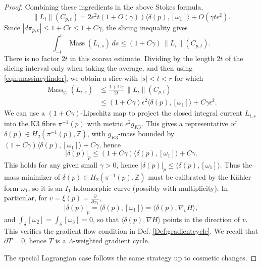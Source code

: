 \documentclass[10pt,a4paper]{amsart}
\newcommand{\Z}{\mathbb{Z}}
\newcommand{\norm}[1]{\left\lVert#1\right\rVert}
\begin{document}
\begin{proof}
			
			
			Combining these ingredients in the above Stokes formula,
			\begin{equation}\label{eqn:massincylinder}
			\norm{L_i}(  C_{p,t}   )= 2\epsilon^2 t (1+ O(\gamma ) ) \langle \delta(p) , [\omega_1] \rangle + O(\gamma  t \epsilon^2) .
			\end{equation}
		Since $|d\pi_{p,v}|\leq 1+Cr\leq 1+C\gamma$, the slicing inequality gives
				\[
				\int_{-t}^{t}\operatorname{Mass}(L_{i,s})\,ds
				\leq (1+C\gamma)\,\norm{L_i}(C_{p,t}).
				\]
				There is no factor $2t$ in this coarea estimate. Dividing by the length $2t$ of the slicing interval only when taking the average, and then using \eqref{eqn:massincylinder}, we obtain a slice with $|s|<t<r$ for which
				\[
				\begin{split}
					\operatorname{Mass}_{g_\epsilon}(L_{i,s})
					&\leq \frac{1+C\gamma}{2t}\,\norm{L_i}(C_{p,t})\\
					&\leq (1+C\gamma)\epsilon^2\langle\delta(p),[\omega_1]\rangle
					+C\gamma\epsilon^2.
				\end{split}
				\]
			We can use a $(1+C\gamma)$-Lipschitz map to project the closed integral current $L_{i,s}$ into the K3 fibre $\pi^{-1}(p)$ with metric $\epsilon^2 g_{K3}$. This gives a representative of $\delta(p)\in H_2(\pi^{-1}(p),\Z )$, with $g_{K3}$-mass bounded by $(1+ C\gamma)\langle \delta(p) , [\omega_1] \rangle + C\gamma $, hence
			\begin{equation*}
	|\delta(p) |_p \leq (1+ C\gamma)\langle \delta(p) , [\omega_1] \rangle + C\gamma .
			\end{equation*}
			This holds for any given small $\gamma>0$, hence 
$
	|\delta(p)|_p \leq  \langle \delta(p) , [\omega_1] \rangle .
$
Thus the mass minimizer of $\delta(p) \in H_2(\pi^{-1}(p),\Z )$ must be calibrated by the K\"ahler form $\omega_1$, so it is an $I_1$-holomorphic curve (possibly with multiplicity). In particular, for $v= \xi(p)= \frac{\partial}{\partial x_1}$, 
\begin{equation}\label{eqn:densitycalibration}
|\delta(p)|_p = \langle \delta(p) , [\omega_1] \rangle = \langle \delta(p), \nabla_v H\rangle ,
\end{equation}
and $\int_\delta [\omega_2]= \int_\delta [\omega_3]=0$, so that $\langle \delta(p), \nabla H\rangle $ points in the direction of $v$. This verifies the gradient flow condition in Def. \ref{Def:gradientcycle}. We recall that $\partial T=0$, hence $T$ is a $\Lambda$-weighted gradient cycle.

The special Lagrangian case follows the same strategy up to cosmetic changes.
		\end{proof}
\end{document}
